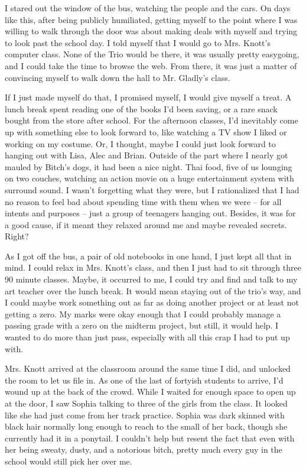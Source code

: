 I stared out the window of the bus, watching the people and the cars.  On days like this, after being publicly humiliated, getting myself to the point where I was willing to walk through the door was about making deals with myself and trying to look past the school day.  I told myself that I would go to Mrs. Knott's computer class.  None of the Trio would be there, it was usually pretty easygoing, and I could take the time to browse the web.  From there, it was just a matter of convincing myself to walk down the hall to Mr. Gladly's class.



If I just made myself do that, I promised myself, I would give myself a treat.  A lunch break spent reading one of the books I'd been saving, or a rare snack bought from the store after school.  For the afternoon classes, I'd inevitably come up with something else to look forward to, like watching a TV show I liked or working on my costume.  Or, I thought, maybe I could just look forward to hanging out with Lisa, Alec and Brian.  Outside of the part where I nearly got mauled by Bitch's dogs, it had been a nice night.  Thai food, five of us lounging on two couches, watching an action movie on a huge entertainment system with surround sound.  I wasn't forgetting what they were, but I rationalized that I had no reason to feel bad about spending time with them when we were – for all intents and purposes – just a group of teenagers hanging out.  Besides, it was for a good cause, if it meant they relaxed around me and maybe revealed secrets.  Right?



As I got off the bus, a pair of old notebooks in one hand, I just kept all that in mind.  I could relax in Mrs. Knott's class, and then I just had to sit through three 90 minute classes.  Maybe, it occurred to me, I could try and find and talk to my art teacher over the lunch break.  It would mean staying out of the trio's way, and I could maybe work something out as far as doing another project or at least not getting a zero.  My marks were okay enough that I could probably manage a passing grade with a zero on the midterm project, but still, it would help.  I wanted to do more than just pass, especially with all this crap I had to put up with.



Mrs. Knott arrived at the classroom around the same time I did, and unlocked the room to let us file in.  As one of the last of fortyish students to arrive, I'd wound up at the back of the crowd.  While I waited for enough space to open up at the door, I saw Sophia talking to three of the girls from the class.  It looked like she had just come from her track practice.  Sophia was dark skinned with black hair normally long enough to reach to the small of her back, though she currently had it in a ponytail.  I couldn't help but resent the fact that even with her being sweaty, dusty, and a notorious bitch, pretty much every guy in the school would still pick her over me.



